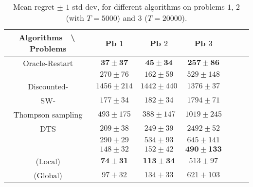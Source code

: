 \begin{table}[ht]
    \centering
    \begin{tabular}{c|cccccc}
    \textbf{Algorithms} $\;$ \textbackslash $\;$ \textbf{Problems} & Pb $1$ & Pb $2$ & Pb $3$ \\
        \hline
        Oracle-Restart \klUCB{} & $\mathbf{37 \pm 37}$ & $\mathbf{45 \pm 34}$ & $\mathbf{257 \pm 86}$ \\
        \hline
        \klUCB{} & $270 \pm 76$ & $162 \pm 59$ & $529 \pm 148$ \\
        Discounted-\klUCB{} & $1456 \pm 214$ & $1442 \pm 440$ & $1376 \pm 37$ \\
        SW-\klUCB{} & $177 \pm 34$ & $182 \pm 34$ & $1794 \pm 71$ \\
        \hline
        Thompson sampling & $493 \pm 175$ & $388 \pm 147$ & $1019 \pm 245$ \\
        DTS & $209 \pm 38$ & $249 \pm 39$ & $2492 \pm 52$ \\
        \hline
        \MklUCB{} & $290 \pm 29$ & $534 \pm 93$ & $645 \pm 141$ \\
        \CUSUMklUCB{} & $148 \pm 32$ & $152 \pm 42$ & $\mathbf{490 \pm 133}$ \\
        \hline
        \GLRklUCB{}(Local) & $\mathbf{74 \pm 31}$ & $\mathbf{113 \pm 34}$ & $513 \pm 97$ \\
        \GLRklUCB{}(Global) & $97 \pm 32$ & $134 \pm 33$ & $621 \pm 103$
    \end{tabular}
    \caption{Mean regret $\pm$ $1$ std-dev, for different algorithms on problems $1$, $2$ (with $T=5000$) and $3$ ($T=20000$).
    }
    \label{table:6:totalResults1}
\end{table}

